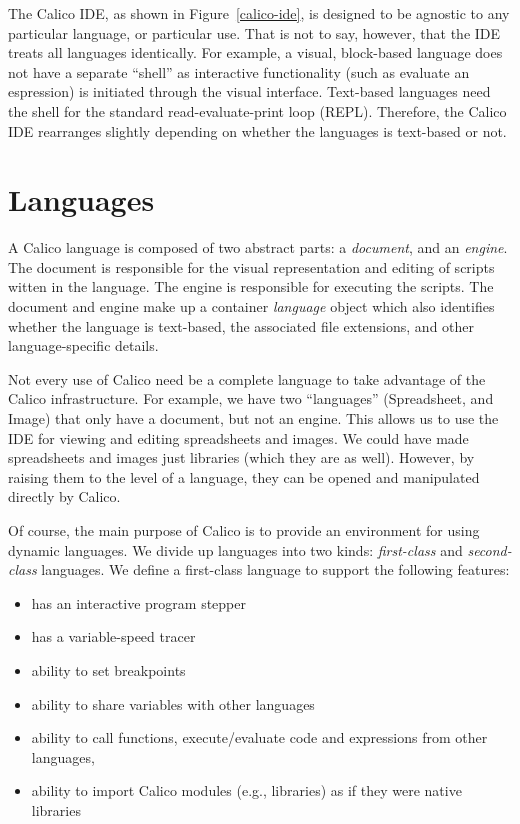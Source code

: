 \documentclass[preprint]{sigplanconf}
\begin{document}
The Calico IDE, as shown in Figure~\ref{calico-ide}, is designed to be
agnostic to any particular language, or particular use. That is not to
say, however, that the IDE treats all languages identically. For
example, a visual, block-based language does not have a separate
``shell'' as interactive functionality (such as evaluate an
espression) is initiated through the visual interface. Text-based
languages need the shell for the standard read-evaluate-print loop
(REPL). Therefore, the Calico IDE rearranges slightly depending on
whether the languages is text-based or not.

\section{Languages}

A Calico language is composed of two abstract parts: a
\textit{document}, and an \textit{engine}. The document is responsible
for the visual representation and editing of scripts witten in the
language. The engine is responsible for executing the scripts. The
document and engine make up a container \textit{language} object which
also identifies whether the language is text-based, the associated
file extensions, and other language-specific details.

Not every use of Calico need be a complete language to take advantage
of the Calico infrastructure. For example, we have two ``languages''
(Spreadsheet, and Image) that only have a document, but not an
engine. This allows us to use the IDE for viewing and editing
spreadsheets and images. We could have made spreadsheets and images
just libraries (which they are as well). However, by raising them to
the level of a language, they can be opened and manipulated directly
by Calico.

Of course, the main purpose of Calico is to provide an environment for
using dynamic languages. We divide up languages into two kinds:
\textit{first-class} and \textit{second-class} languages. We define a
first-class language to support the following features:

\begin{itemize}

\item has an interactive program stepper
\item has a variable-speed tracer
\item ability to set breakpoints
\item ability to share variables with other languages
\item ability to call functions, execute/evaluate code and expressions from other languages,
\item ability to import Calico modules (e.g., libraries) as if they were native libraries

\end{itemize}
\end{document}
